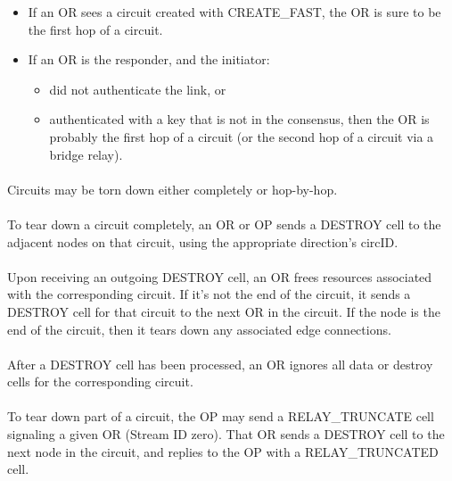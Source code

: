 \begin{itemize}
    \item If an OR sees a circuit created with CREATE\_FAST, the OR is sure to be
    the first hop of a circuit.
    \item If an OR is the responder, and the initiator:
    \begin{itemize}
        \item did not authenticate the link, or
        \item authenticated with a key that is not in the consensus,
        then the OR is probably the first hop of a circuit (or the second hop of
        a circuit via a bridge relay).
    \end{itemize}
\end{itemize}

\paragraph{}
Circuits may be torn down either completely or hop-by-hop.

\paragraph{}
To tear down a circuit completely, an OR or OP sends a DESTROY
cell to the adjacent nodes on that circuit, using the appropriate
direction's circID.

\paragraph{}
Upon receiving an outgoing DESTROY cell, an OR frees resources
associated with the corresponding circuit. If it's not the end of
the circuit, it sends a DESTROY cell for that circuit to the next OR
in the circuit. If the node is the end of the circuit, then it tears
down any associated edge connections.

\paragraph{}
After a DESTROY cell has been processed, an OR ignores all data or
destroy cells for the corresponding circuit.

\paragraph{}
To tear down part of a circuit, the OP may send a RELAY\_TRUNCATE cell
signaling a given OR (Stream ID zero). That OR sends a DESTROY
cell to the next node in the circuit, and replies to the OP with a
RELAY\_TRUNCATED cell.

